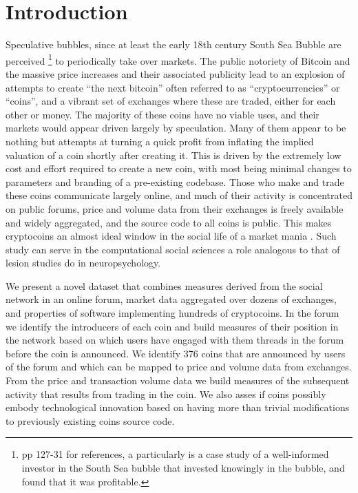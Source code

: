 \section{Introduction}

Speculative bubbles, since at least the early 18th century South Sea Bubble are perceived \footnote{\cite{garber2001famous} pp 127-31 for references, a particularly is \cite{temin2004riding} a case study of a well-informed investor in the South Sea bubble that invested knowingly in the bubble, and found that it was profitable. } to periodically take over markets. %
The public notoriety of Bitcoin and the massive price increases and their associated publicity  lead to an explosion of attempts to create ``the next bitcoin'' often referred to as ``cryptocurrencies'' or ``coins'', and a vibrant set of exchanges where these are traded, either for each other or money.
The majority of these coins have no viable uses, and their markets would appear driven largely by speculation.
Many of them appear to be nothing but attempts at turning a quick profit from inflating the implied valuation of a coin shortly after creating it.
This is driven by the extremely low cost and effort required to create a new coin, with most being minimal changes to parameters and branding of a pre-existing codebase.
Those who make and trade these coins communicate largely online, and much of their activity is concentrated on public forums, price and volume data from their exchanges is freely available and widely aggregated, and the source code to all coins is public.
This makes cryptocoins an almost ideal window in the social life of a market mania \cite{cosma2008}.
Such study can serve in the computational social sciences a role analogous to that of lesion studies do in neuropsychology.



We present a novel dataset that combines measures derived from the social network in an online forum, market data aggregated over dozens of exchanges, and properties of software implementing hundreds of cryptocoins.
In the forum we identify the introducers of each coin and build measures of their position in the network based on which users have engaged with them threads in the forum before the coin is announced.
We identify 376 coins that are announced by users of the forum and which can be mapped to price and volume data from exchanges.
From the price and transaction volume data we build measures of the subsequent activity that results from trading in the coin. 
We also asses if coins possibly embody technological innovation based on having more than trivial modifications to previously existing coins source code.

